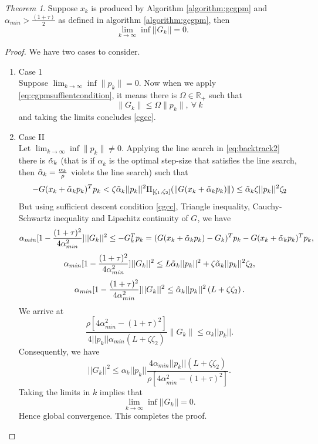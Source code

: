\documentclass{article}
\newcommand{\R}{\mathbb{R}} %
\theoremstyle{remark}
\newtheorem{theorem}{Theorem}
\begin{document}
{{\begin{theorem}
\label{theorem:globalconvcgpm}
    Suppose $x_k$ is produced by  Algorithm \ref{algorithm:gcgpm} and $\alpha_{min}> \frac{(1+\tau)}{2}$ as defined in algorithm \ref{algorithm:gcgpm}, then 
    \begin{equation}\label{cgcc}
       \lim_{k\rightarrow \infty}\inf ||G_k||=0 .
    \end{equation}  
\end{theorem}
\begin{proof}
We have two cases to consider.
\begin{enumerate}
    \item Case 1\\
    Suppose $\lim_{k\rightarrow \infty}\inf\|p_k\|=0$. Now when we apply \eqref{eq:cgpmsuffientcondition}, it means there is $\Omega \in \R_+$ such that  
    \[
    \|G_k\|\leq \Omega\|p_k\|, ~\forall ~k
    \]
    and taking the limits concludes \eqref{cgcc}.
    \item Case II\\
    Let $\lim_{k\rightarrow \infty}\inf\|p_k\|\neq 0$.  Applying the line search in \eqref{eq:backtrack2} there is $\Tilde{\alpha}_k$ (that is if $\alpha_k$ is the optimal step-size that satisfies the line search, then $\Tilde{\alpha}_k=\frac{\alpha_k}{\rho}$ violets the line search) such that 
    \begin{equation}
    \label{eq:violetscgpm}
    -G(x_k+\Tilde{\alpha}_k p_k)^Tp_k< \zeta\Tilde{\alpha}_k||p_k||^2\Pi_{[\zeta_1, \zeta_2]}(\|G(x_k + \Tilde{\alpha}_k p_k)\|)\leq \Tilde{\alpha}_k\zeta||p_k||^2\zeta_2
    \end{equation}
    But using sufficient descent condition \eqref{cgcc}, Triangle inequality, Cauchy-Schwartz inequality and Lipschitz continuity of $G$, we have
    \[
    \alpha_{min}[1-\frac{(1+\tau)^2}{4\alpha_{min}^2}] ||G_k||^2 \leq -G_k^Tp_k=(G(x_k+\Tilde{\alpha}_kp_k)-G_k)^Tp_k-G(x_k+\Tilde{\alpha}_kp_k)^Tp_k,
    \]
     \[
    \alpha_{min}[1-\frac{(1+\tau)^2}{4\alpha_{min}^2}] ||G_k||^2 \leq L\Tilde{\alpha}_k||p_k||^2+\zeta\Tilde{\alpha}_k||p_k||^2\zeta_2,
    \]
     \[
    \alpha_{min}[1-\frac{(1+\tau)^2}{4\alpha_{min}^2}] ||G_k||^2 \leq \Tilde{\alpha}_k||p_k||^2\left(L+\zeta\zeta_2\right).\]
    We arrive at
    \[
    \frac{\rho [4\alpha_{min}^2-(1+\tau)^2] }{4||p_k||\alpha_{min}(L+\zeta\zeta_2 )}\|G_k\|\leq \alpha_k||p_k||.
    \]
    Consequently, we have
    \[
     ||G_k||^2\leq \alpha_k||p_k||\frac{4\alpha_{min}||p_k||(L+\zeta\zeta_2) }{\rho[4\alpha_{min}^2-(1+\tau)^2]}.
    \]
    Taking the limits in $k$ implies that 
    \[
    \lim_{k\rightarrow \infty}\inf ||G_k||=0.
    \]
    Hence global convergence. This completes the proof.
\end{enumerate} 
\end{proof}
}
}
\end{document}
